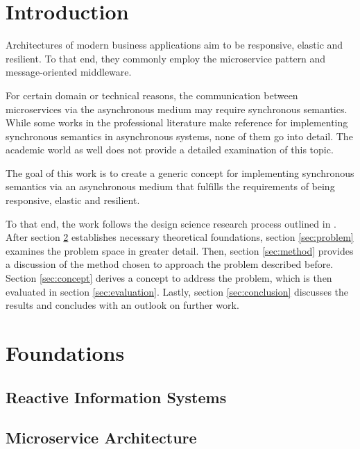 
\section{Introduction}

Architectures of modern business applications aim to be responsive, elastic and resilient.
To that end, they commonly employ the microservice pattern and message-oriented
middleware.

For certain domain or technical reasons, the communication between microservices via the asynchronous medium may require synchronous semantics.
While some works in the professional literature \parencites{millett_patterns_2015,richardson_microservices_2019,stopford_designing_2018} make reference for implementing synchronous semantics in asynchronous systems, none of them go into detail.
The academic world as well does not provide a detailed examination of this topic.

The goal of this work is to create a generic concept for implementing synchronous semantics via an asynchronous medium that fulfills the requirements of being responsive, elastic and resilient.

To that end, the work follows the design science research process outlined in \parencite{cole_being_2005}.
After section \ref{sec:foundations} establishes necessary theoretical foundations, section \ref{sec:problem} examines the problem space in greater detail.
Then, section \ref{sec:method} provides a discussion of the method chosen to approach the problem described before.
Section \ref{sec:concept} derives a concept to address the problem, which is then evaluated in section \ref{sec:evaluation}.
Lastly, section \ref{sec:conclusion} discusses the results and concludes with an outlook on further work.

\section{Foundations}\label{sec:foundations}

\subsection{Reactive Information Systems}

\subsection{Microservice Architecture}

